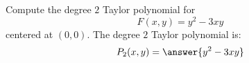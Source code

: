 \documentclass{ximera}
\author{Bart Snapp}
\begin{document}
\begin{exercise}
  Compute the degree $2$ Taylor polynomial for
  \[
  F(x,y) = y^2-3xy
  \]
  centered at $(0,0)$.  The degree $2$ Taylor polynomial is:
  \[
  P_2(x,y) =\answer{y^2-3xy}
  \]
\end{exercise}
\end{document}
